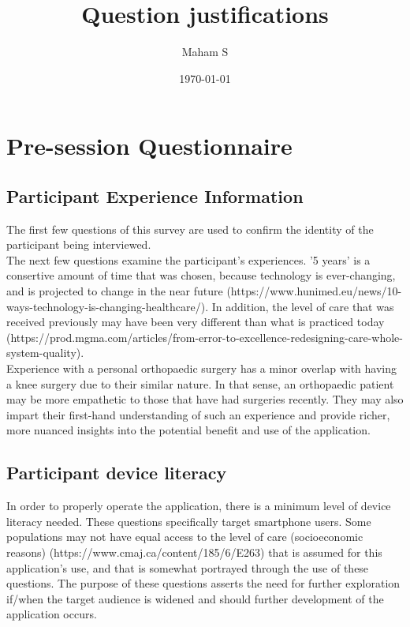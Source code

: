 \documentclass{article} %
\title{Question justifications}
\author{Maham S}
\date{\today}
\begin{document}
\maketitle
\newpage
\tableofcontents
\newpage
\section{Pre-session Questionnaire}
\subsection{\textbf{Participant Experience Information}}
The first few questions of this survey are used to confirm the identity of the participant being interviewed. \\
The next few questions examine the participant's experiences. '5 years' is a consertive amount of time that was chosen, because technology is ever-changing, 
and is projected to change in the near future (https://www.hunimed.eu/news/10-ways-technology-is-changing-healthcare/).
In addition, the level of care that was received previously may have been very different than what is practiced today 
(https://prod.mgma.com/articles/from-error-to-excellence-redesigning-care-whole-system-quality). \\
Experience with a personal orthopaedic surgery has a minor overlap with having a knee surgery due to their similar nature.
In that sense, an orthopaedic patient may be more empathetic to those that have had surgeries recently. They may also impart
their first-hand understanding of such an experience and provide richer, more nuanced insights into the potential 
benefit and use of the application. 
\subsection{\textbf{Participant device literacy}}
In order to properly operate the application, there is a minimum level of device literacy needed. These questions specifically
target smartphone users. Some populations may not have equal access to the level of care (socioeconomic reasons) (https://www.cmaj.ca/content/185/6/E263) that is assumed 
for this application's use, and that is somewhat portrayed through the use of these questions. The purpose of these questions asserts the
need for further exploration if/when the target audience is widened and should further development of the application occurs. \\  %
\end{document}
